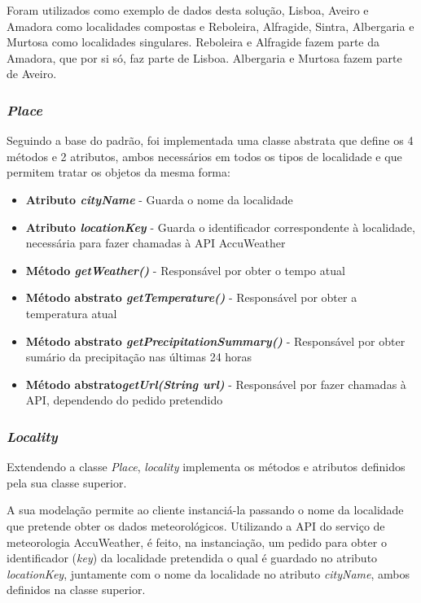 \documentclass[10pt,portuguese]{article}
\begin{document}
\par Foram utilizados como exemplo de dados desta solução, Lisboa, Aveiro e Amadora como localidades compostas e Reboleira, Alfragide, Sintra, Albergaria e Murtosa como localidades singulares. Reboleira e Alfragide fazem parte da Amadora, que por si só, faz parte de Lisboa. Albergaria e Murtosa fazem parte de Aveiro.

\subsubsection{\textit{Place}}

\par Seguindo a base do padrão, foi implementada uma classe abstrata que define os 4 métodos e 2 atributos, ambos necessários em todos os tipos de localidade e que permitem tratar os objetos da mesma forma:

\begin{itemize}
    \item \textbf{Atributo \textit{cityName}} - Guarda o nome da localidade
    \item \textbf{Atributo \textit{locationKey}} - Guarda o identificador correspondente à localidade, necessária para fazer chamadas à API AccuWeather
    \item \textbf{Método \textit{getWeather()}} - Responsável por obter o tempo atual
    \item \textbf{Método abstrato \textit{getTemperature()}} - Responsável por obter a temperatura atual
    \item \textbf{Método abstrato \textit{getPrecipitationSummary()}} - Responsável por obter sumário da precipitação nas últimas 24 horas
    \item \textbf{Método abstrato\textit{getUrl(String url)}} - Responsável por fazer chamadas à API, dependendo do pedido pretendido
\end{itemize}

\subsubsection{\textit{Locality}}

\par Extendendo a classe \textit{Place}, \textit{locality} implementa os métodos e atributos definidos pela sua classe superior.

\par A sua modelação permite ao cliente instanciá-la passando o nome da localidade que pretende obter os dados meteorológicos. Utilizando a API do serviço de meteorologia AccuWeather, é feito, na instanciação, um pedido para obter o identificador (\textit{key}) da localidade pretendida o qual é guardado no atributo \textit{locationKey}, juntamente com o nome da localidade no atributo \textit{cityName}, ambos definidos na classe superior.
\end{document}
